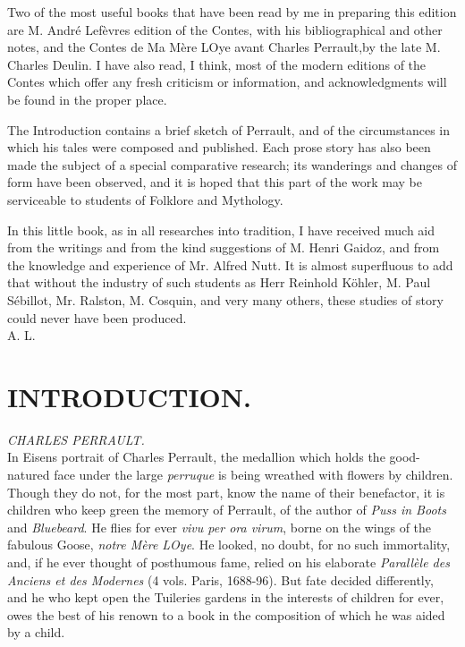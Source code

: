 \documentclass[14pt,a4paper]{memoir}
\begin{document}
Two of the most useful books that have been read by me in
preparing this edition are M. André Lefèvre\textquotesingle s
edition of the Contes, with his bibliographical and other notes,
and the \textquotesingle Contes de Ma Mère L\textquotesingle Oye avant
Charles Perrault,\textquotesingle by the late M. Charles Deulin.
I have also read, I think, most of the modern editions of the
Contes which offer any fresh criticism or information, and
acknowledgments will be found in the proper place.

The Introduction contains a brief sketch of Perrault, and
of the circumstances in which his tales were composed and published.
Each prose story has also been made the subject of a special comparative
research; its wanderings and changes of form have been observed, and it
is hoped that this part of the work may be serviceable to students of Folklore and Mythology.

In this little book, as in all researches into tradition, I have
received much aid from the writings and from the kind suggestions of M.
Henri Gaidoz, and from the knowledge and experience of Mr. Alfred
Nutt. It is almost superfluous to add that without the industry of
such students as Herr Reinhold Köhler, M. Paul Sébillot, Mr. Ralston,
M. Cosquin, and very many others, these studies of story could
never have been produced. \\

A. L.


\newpage
\section{INTRODUCTION.}

\emph{CHARLES PERRAULT.} \\

In Eisen\textquotesingle s portrait of Charles Perrault, the medallion
which holds the good-natured face under the large \emph{perruque} is
being wreathed with flowers by children. Though they do not, for the
most part, know the name of their benefactor, it is children who keep
green the memory of Perrault, of the author of \emph{Puss in Boots} and
\emph{Bluebeard}. He flies for ever \emph{vivu\textquotesingle{} per ora
virum}, borne on the wings of the fabulous Goose, \emph{notre Mère
L\textquotesingle Oye}. He looked, no doubt, for no such immortality,
and, if he ever thought of posthumous fame, relied on his elaborate
\emph{Parallèle des Anciens et des Modernes} (4 vols. Paris, 1688-96).
But fate decided differently, and he who kept open the Tuileries gardens
in the interests of children for ever, owes the best of his renown to a
book in the composition of which he was aided by a child.
\end{document}
